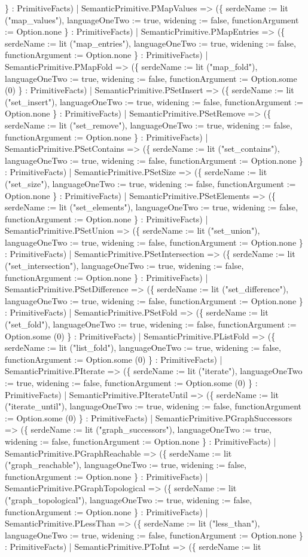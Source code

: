 \documentclass[11pt]{article}
\begin{document}
\} : PrimitiveFacts) | SemanticPrimitive.PMapValues => (\{ serdeName := lit ("map\_values"), languageOneTwo := true, widening := false, functionArgument := Option.none \} : PrimitiveFacts) | SemanticPrimitive.PMapEntries => (\{ serdeName := lit ("map\_entries"), languageOneTwo := true, widening := false, functionArgument := Option.none \} : PrimitiveFacts) | SemanticPrimitive.PMapFold => (\{ serdeName := lit ("map\_fold"), languageOneTwo := true, widening := false, functionArgument := Option.some (0) \} : PrimitiveFacts) | SemanticPrimitive.PSetInsert => (\{ serdeName := lit ("set\_insert"), languageOneTwo := true, widening := false, functionArgument := Option.none \} : PrimitiveFacts) | SemanticPrimitive.PSetRemove => (\{ serdeName := lit ("set\_remove"), languageOneTwo := true, widening := false, functionArgument := Option.none \} : PrimitiveFacts) | SemanticPrimitive.PSetContains => (\{ serdeName := lit ("set\_contains"), languageOneTwo := true, widening := false, functionArgument := Option.none \} : PrimitiveFacts) | SemanticPrimitive.PSetSize => (\{ serdeName := lit ("set\_size"), languageOneTwo := true, widening := false, functionArgument := Option.none \} : PrimitiveFacts) | SemanticPrimitive.PSetElements => (\{ serdeName := lit ("set\_elements"), languageOneTwo := true, widening := false, functionArgument := Option.none \} : PrimitiveFacts) | SemanticPrimitive.PSetUnion => (\{ serdeName := lit ("set\_union"), languageOneTwo := true, widening := false, functionArgument := Option.none \} : PrimitiveFacts) | SemanticPrimitive.PSetIntersection => (\{ serdeName := lit ("set\_intersection"), languageOneTwo := true, widening := false, functionArgument := Option.none \} : PrimitiveFacts) | SemanticPrimitive.PSetDifference => (\{ serdeName := lit ("set\_difference"), languageOneTwo := true, widening := false, functionArgument := Option.none \} : PrimitiveFacts) | SemanticPrimitive.PSetFold => (\{ serdeName := lit ("set\_fold"), languageOneTwo := true, widening := false, functionArgument := Option.some (0) \} : PrimitiveFacts) | SemanticPrimitive.PListFold => (\{ serdeName := lit ("list\_fold"), languageOneTwo := true, widening := false, functionArgument := Option.some (0) \} : PrimitiveFacts) | SemanticPrimitive.PIterate => (\{ serdeName := lit ("iterate"), languageOneTwo := true, widening := false, functionArgument := Option.some (0) \} : PrimitiveFacts) | SemanticPrimitive.PIterateUntil => (\{ serdeName := lit ("iterate\_until"), languageOneTwo := true, widening := false, functionArgument := Option.some (0) \} : PrimitiveFacts) | SemanticPrimitive.PGraphSuccessors => (\{ serdeName := lit ("graph\_successors"), languageOneTwo := true, widening := false, functionArgument := Option.none \} : PrimitiveFacts) | SemanticPrimitive.PGraphReachable => (\{ serdeName := lit ("graph\_reachable"), languageOneTwo := true, widening := false, functionArgument := Option.none \} : PrimitiveFacts) | SemanticPrimitive.PGraphTopological => (\{ serdeName := lit ("graph\_topological"), languageOneTwo := true, widening := false, functionArgument := Option.none \} : PrimitiveFacts) | SemanticPrimitive.PLessThan => (\{ serdeName := lit ("less\_than"), languageOneTwo := true, widening := false, functionArgument := Option.none \} : PrimitiveFacts) | SemanticPrimitive.PToInt => (\{ serdeName := lit 
\end{document}
